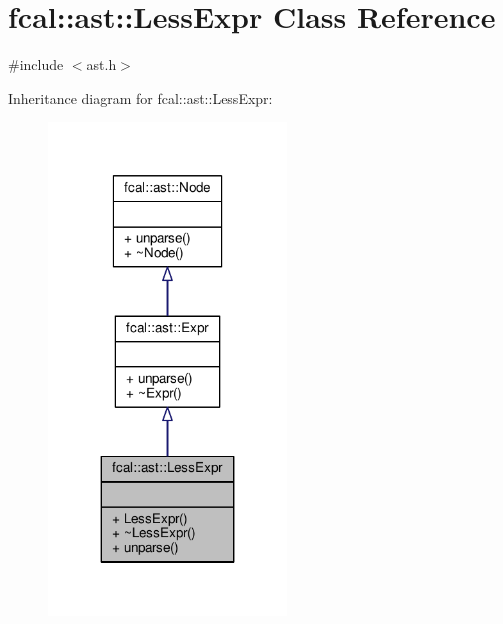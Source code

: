 \hypertarget{classfcal_1_1ast_1_1LessExpr}{}\section{fcal\+:\+:ast\+:\+:Less\+Expr Class Reference}
\label{classfcal_1_1ast_1_1LessExpr}


{\ttfamily \#include $<$ast.\+h$>$}



Inheritance diagram for fcal\+:\+:ast\+:\+:Less\+Expr\+:
\nopagebreak
\begin{figure}[H]
\begin{center}
\leavevmode
\includegraphics[width=179pt]{classfcal_1_1ast_1_1LessExpr__inherit__graph}
\end{center}
\end{figure}



